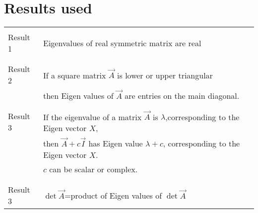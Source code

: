 \documentclass[journal,12pt,twocolumn]{IEEEtran}
\begin{document}
\section{\textbf{Results used}}
\begin{table}[h!]
\begin{center}
\begin{tabular}{|p{2cm}|p{13cm}|}
\hline
&\\
Result 1 & Eigenvalues of real symmetric matrix are real\\
&\\
\hline
&\\
Result 2 & If a square matrix  $\vec{A}$ is lower or upper triangular\\& then Eigen values of $\vec{A}$ are  entries on the main diagonal.\\ 
&\\
\hline
&\\
Result 3 &If the eigenvalue of a matrix $\vec{A}$ is $\lambda $,corresponding to the Eigen vector $X$,\\&then
$\vec{A}+c\vec{I}$ has Eigen value $\lambda+c$, corresponding to the Eigen vector $X$.\\&$c$ can be scalar or complex.\\
&\\
\hline
&\\
Result 3&$\det\vec{A}$=product of Eigen values of $\det\vec{A}$
&\\
\hline
    \end{tabular}
    \end{center}
\end{table}
\end{document}

